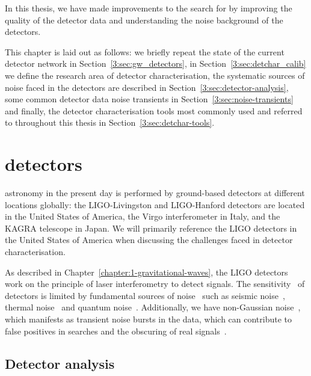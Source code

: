 
In this thesis, we have made improvements to the search for \gws by improving the quality of the detector data and understanding the noise background of the detectors. 

This chapter is laid out as follows: we briefly repeat the state of the current \gwadj detector network in Section~\ref{3:sec:gw_detectors}, in Section~\ref{3:sec:detchar_calib} we define the research area of detector characterisation, the systematic sources of noise faced in the detectors are described in Section~\ref{3:sec:detector-analysis}, some common detector data noise transients in Section~\ref{3:sec:noise-transients} and finally, the detector characterisation tools most commonly used and referred to throughout this thesis in Section~\ref{3:sec:detchar-tools}.

\section{\label{3:sec:gw_detectors}\Gwadj detectors}

\Gwadj astronomy in the present day is performed by ground-based detectors at different locations globally: the LIGO-Livingston and LIGO-Hanford detectors are located in the United States of America, the Virgo interferometer in Italy, and the KAGRA telescope in Japan. We will primarily reference the LIGO detectors in the United States of America when discussing the challenges faced in detector characterisation. 

As described in Chapter~\ref{chapter:1-gravitational-waves}, the LIGO detectors work on the principle of laser interferometry to detect \gwadj signals. The sensitivity~\cite{aLIGO_design_curve:2018} of \gwadj detectors is limited by fundamental sources of noise~\cite{PSD_var:2020} such as seismic noise~\cite{Glanzer:2023}, thermal noise~\cite{thermal_noise:2018} and quantum noise~\cite{quantum_noise:2003}. Additionally, we have non-Gaussian noise~\cite{Noise_Guide:2020}, which manifests as transient noise bursts in the data, which can contribute to false positives in \gwadj searches and the obscuring of real \gwadj signals~\cite{GW170817:2017, GW150914_noise:2016}.

\subsection{\label{3:sec:detector-analysis}Detector analysis}

